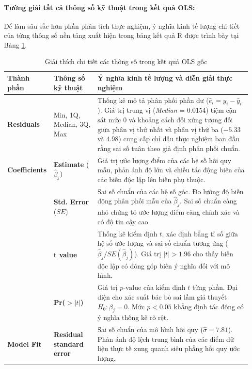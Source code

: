 	\paragraph{Tường giải tất cả thông số kỹ thuật trong kết quả OLS:}
	Để làm sâu sắc hơn phần phân tích thực nghiệm, ý nghĩa kinh tế lượng chi tiết của từng thông số nền tảng xuất hiện trong bảng kết quả R được trình bày tại Bảng \ref{tab:ols_full_parameters}.

	\begin{table}[H]
		\centering
		\caption{Giải thích chi tiết các thông số trong kết quả OLS gốc}
		\label{tab:ols_full_parameters}
		\small
		\renewcommand{\arraystretch}{1.3}
		\begin{tabularx}{\textwidth}{l p{3.2cm} X}
			\toprule
			\textbf{Thành phần} & \textbf{Thông số kỹ thuật} & \textbf{Ý nghĩa kinh tế lượng và diễn giải thực nghiệm} \\
			\midrule
			\textbf{Residuals} & Min, 1Q, Median, 3Q, Max & Thống kê mô tả phân phối phần dư ($\hat{e}_i = y_i - \hat{y}_i$). Giá trị trung vị (\textit{Median} = 0.0154) tiệm cận sát mức 0 và khoảng cách đối xứng tương đối giữa phân vị thứ nhất và phân vị thứ ba ($-5.33$ và $4.98$) cung cấp chỉ dấu thực nghiệm ban đầu rằng sai số tuân theo giả định phân phối chuẩn. \\
			\addlinespace
			\textbf{Coefficients} & \textbf{Estimate} ($\hat{\beta}_j$) & Giá trị ước lượng điểm của các hệ số hồi quy mẫu, phản ánh độ lớn và chiều tác động biên của các biến độc lập lên biến phụ thuộc. \\
			\addlinespace
			& \textbf{Std. Error} ($SE$) & Sai số chuẩn của các hệ số góc. Đo lường độ biến động phân phối mẫu của $\hat{\beta}_j$. Sai số chuẩn càng nhỏ chứng tỏ ước lượng điểm càng chính xác và có độ tin cậy cao. \\
			\addlinespace
			& \textbf{t value} & Thống kê kiểm định $t$, xác định bằng tỉ số giữa hệ số ước lượng và sai số chuẩn tương ứng ($\hat{\beta}_j / SE(\hat{\beta}_j)$). Giá trị $|t| > 1.96$ cho thấy biến độc lập có đóng góp biên ý nghĩa đối với mô hình. \\
			\addlinespace
			& \textbf{Pr($>|t|$)} & Giá trị $p\text{-value}$ của kiểm định $t$ từng phần. Đại diện cho xác suất bác bỏ sai lầm giả thuyết $H_0: \beta_j = 0$. Mức $p < 0.05$ khẳng định tác động có ý nghĩa thống kê rõ rệt. \\
			\addlinespace
			\textbf{Model Fit} & \textbf{Residual standard error} & Sai số chuẩn của mô hình hồi quy ($\hat{\sigma} = 7.81$). Phản ánh độ lệch trung bình của các điểm dữ liệu thực tế xung quanh siêu phẳng hồi quy ước lượng. \\

\end{tabularx}
\end{table}

